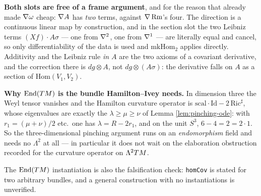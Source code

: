 \begin{lemma}
  \textbf{Both slots are free of a frame argument}, and for the reason that already made
  $\nabla\omega$ cheap: $\nabla A$ has \emph{two} terms, against $\nabla\operatorname{Rm}$'s four. The direction
  is a continuous linear map by construction, and in the section slot the two Leibniz terms
  $(Xf)\cdot A\sigma$ --- one from $\nabla^2$, one from $\nabla^1$ --- are literally equal and
  cancel, so only differentiability of the data is used and $\mathrm{mkHom}_2$ applies
  directly. Additivity and the Leibniz rule \emph{in $A$} are the two axioms of a covariant
  derivative, and the correction there is $dg\otimes A$, not $dg\otimes(A\sigma)$: the
  derivative falls on $A$ as a section of $\mathrm{Hom}(V_1,V_2)$.

  \textbf{Why $\mathrm{End}(TM)$ is the bundle Hamilton--Ivey needs.} In dimension three the
  Weyl tensor vanishes and the Hamilton curvature operator is
  $\mathrm{scal}\cdot\mathrm{Id} - 2\,\mathrm{Ric}^\sharp$, whose eigenvalues are exactly the
  $\lambda \ge \mu \ge \nu$ of Lemma \ref{lem:pinching-ode}: with
  $r_1 = (\mu+\nu)/2$ etc.\ one has $\lambda = R - 2r_1$, and on the unit $S^3$,
  $6 - 4 = 2 = 2\cdot 1$. So the three-dimensional pinching argument runs on an
  \emph{endomorphism} field and needs no $\Lambda^2$ at all --- in particular it does not
  wait on the elaboration obstruction recorded for the curvature operator on
  $\Lambda^2 TM$.

  The $\mathrm{End}(TM)$ instantiation is also the falsification check: \texttt{homCov} is
  stated for two arbitrary bundles, and a general construction with no instantiations is
  unverified.
\end{lemma}


